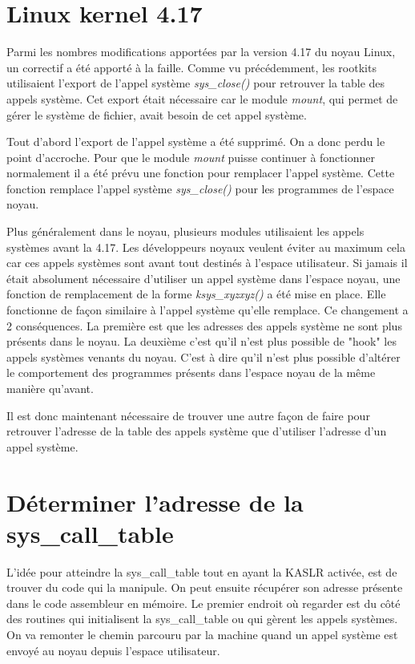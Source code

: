 \documentclass[journal, a4paper]{IEEEtran}
\begin{document}
\section{Linux kernel 4.17}

Parmi les nombres modifications apportées par la version 4.17 du noyau Linux, un correctif a été apporté à la faille. Comme vu précédemment, les rootkits utilisaient l'export de l'appel système \textit{sys\_close()} pour retrouver la table des appels système. Cet export était nécessaire car le module \textit{mount}, qui permet de gérer le système de fichier, avait besoin de cet appel système.

Tout d'abord l'export de l'appel système a été supprimé. On a donc perdu le point d'accroche. Pour que le module \textit{mount} puisse continuer à fonctionner normalement il a été prévu une fonction pour remplacer l'appel système. Cette fonction remplace l'appel système \textit{sys\_close()} pour les programmes de l'espace noyau.

 Plus généralement dans le noyau, plusieurs modules utilisaient les appels systèmes avant la 4.17. Les développeurs noyaux veulent éviter au maximum cela car ces appels systèmes sont avant tout destinés à l'espace utilisateur. Si jamais il était absolument nécessaire d'utiliser un appel système dans l'espace noyau, une fonction de remplacement de la forme \textit{ksys\_xyzxyz()} a été mise en place. Elle fonctionne de façon similaire à l'appel système qu'elle remplace. Ce changement a 2 conséquences. La première est que les adresses des appels système ne sont plus présents dans le noyau. La deuxième c'est qu'il n'est plus possible de "hook" les appels systèmes venants du noyau. C'est à dire qu'il n'est plus possible d'altérer le comportement des programmes présents dans l'espace noyau de la même manière qu'avant.

Il est donc maintenant nécessaire de trouver une autre façon de faire pour retrouver l'adresse de la table des appels système que d'utiliser l'adresse d'un appel système.

\section{Déterminer l'adresse de la sys\_call\_table}

L'idée pour atteindre la sys\_call\_table tout en ayant la KASLR activée, est de trouver du code qui la manipule. On peut ensuite récupérer son adresse présente dans le code assembleur en mémoire. Le premier endroit où regarder est du côté des routines qui initialisent la sys\_call\_table ou qui gèrent les appels systèmes. On va remonter le chemin parcouru par la machine quand un appel système est envoyé au noyau depuis l'espace utilisateur.
\end{document}
